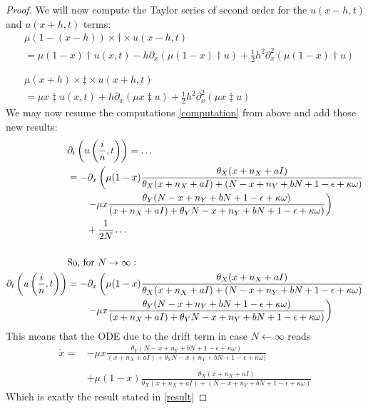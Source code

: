 \documentclass[10pt,a4paper]{article}
\begin{document}
\begin{proof}
We will now compute the Taylor series of second order for the $u\left(x-h,t\right)$ and $u\left(x+h,t\right)$ terms:
\begin{align*}
	&\mu(1-(x-h))\times \dagger \times u\left(x-h,t \right)\\
	&= \mu(1-x)\dagger u\left(x,t\right) - h\partial_x \left(\mu(1-x)\dagger u\right)+\frac{1}{2}h^2\partial^2_x\left(\mu(1-x)\dagger u\right)\\
	&\\
	&\\
	&\mu(x+h)\times \ddagger \times u\left(x+h,t\right) \\
	&= \mu x \ddagger u(x,t) + h\partial_x \left(\mu x \ddagger u\right) + \frac{1}{2}h^2\partial^2_x\left(\mu x\ddagger u\right)
\end{align*}
We may now resume the computations \eqref{computation} from above and add those new results:
\begin{align*}
&\partial_t \left(u\left(\frac{i}{n}, t\right)\right) = \dots \\
&= -\partial_x\left(\mu(1-x)\frac{\theta_X (x + n_X + aI)}{\theta_X (x + n_X + aI) + (N-x + n_Y + bN + 1-\epsilon + \kappa\omega)}\right.\\
&\left.\qquad - \mu x \frac{\theta_Y(N-x+n_Y + bN +1-\epsilon+\kappa\omega)}{(x + n_X+aI) + \theta_YN-x+n_Y + bN +1-\epsilon+\kappa\omega)} \right)\\
&\qquad + \frac{1}{2N} \dots\\
&\\
&\textnormal{So, for } N \rightarrow \infty: \\
\partial_t \left(u\left(\frac{i}{n}, t\right)\right)&= -\partial_x\left(\mu(1-x)\frac{\theta_X (x + n_X + aI)}{\theta_X (x + n_X + aI) + (N-x + n_Y + bN + 1-\epsilon + \kappa\omega)}\right.\\
&\left.\qquad - \mu x \frac{\theta_Y(N-x+n_Y + bN +1-\epsilon+\kappa\omega)}{(x + n_X+aI) + \theta_YN-x+n_Y + bN +1-\epsilon+\kappa\omega)} \right)
\end{align*}
This means that the ODE due to the drift term in case $N \leftarrow \infty$ reads 
\begin{align*}
	\dot{x} = &-\mu x\frac{\theta_Y(N-x+n_Y + bN +1-\epsilon+\kappa\omega)}{(x + n_X+aI) + \theta_YN-x+n_Y + bN +1-\epsilon+\kappa\omega)} \\
	&\\
	\qquad &+ \mu\left(1-x\right)\frac{\theta_X (x + n_X + aI)}{\theta_X (x + n_X + aI) + (N-x + n_Y + bN + 1-\epsilon + \kappa\omega)}
\end{align*}
Which is exatly the result stated in \eqref{result}
\end{proof}
\end{document}
